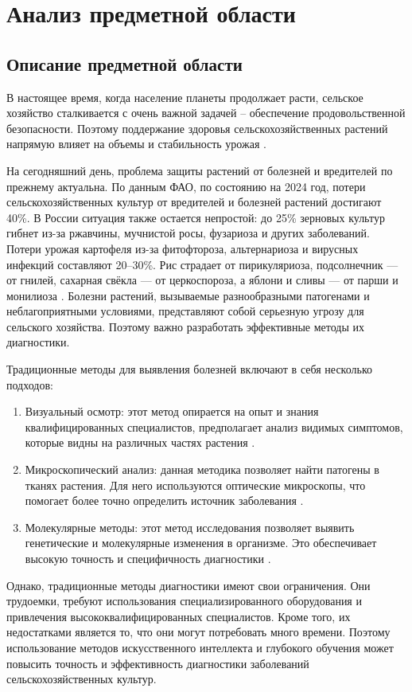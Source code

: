 \section{Анализ предметной области}
\subsection{Описание предметной области}
В настоящее время, когда население планеты продолжает расти, сельское хозяйство сталкивается с очень важной задачей -- обеспечение продовольственной безопасности. Поэтому поддержание здоровья сельскохозяйственных растений напрямую влияет на объемы и стабильность урожая \cite{plant5}.

На сегодняшний день, проблема защиты растений от болезней и вредителей по прежнему актуальна. По данным ФАО, по состоянию на 2024 год, потери сельскохозяйственных культур от вредителей и болезней растений достигают 40\%. В России ситуация также остается непростой: до 25\% зерновых культур гибнет из-за ржавчины, мучнистой росы, фузариоза и других заболеваний. Потери урожая картофеля из-за фитофтороза, альтернариоза и вирусных инфекций составляют 20–30\%. Рис страдает от пирикуляриоза, подсолнечник — от гнилей, сахарная свёкла — от церкоспороза, а яблони и сливы — от парши и монилиоза \cite{plant1}. Болезни растений, вызываемые разнообразными патогенами и неблагоприятными условиями, представляют собой серьезную угрозу для сельского хозяйства. Поэтому важно разработать эффективные методы их диагностики.

Традиционные методы для выявления болезней включают в себя несколько подходов:

\begin{enumerate}
	\item Визуальный осмотр: этот метод опирается на опыт и знания квалифицированных специалистов, предполагает анализ видимых симптомов, которые видны на различных частях растения \cite{plant6}.
	\item Микроскопический анализ: данная методика позволяет найти патогены в тканях растения. Для него используются оптические микроскопы, что помогает более точно определить источник заболевания \cite{plant2}.
	\item Молекулярные методы: этот метод исследования позволяет выявить генетические и молекулярные изменения в организме. Это обеспечивает высокую точность и специфичность диагностики \cite{plant10}.
\end{enumerate}

Однако, традиционные методы диагностики имеют свои ограничения. Они трудоемки, требуют использования специализированного оборудования и привлечения высококвалифицированных специалистов. Кроме того, их недостатками является то, что они могут потребовать много времени. Поэтому использование методов искусственного интеллекта и глубокого обучения может повысить точность и эффективность диагностики заболеваний сельскохозяйственных культур. \cite{vkr1}

